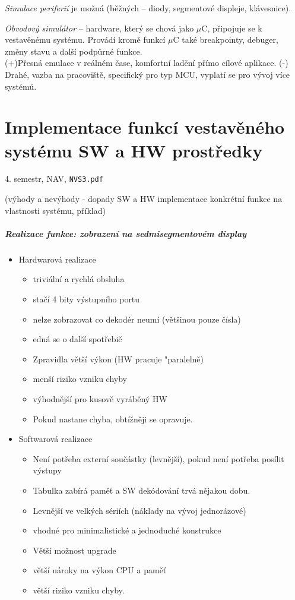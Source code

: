 \documentclass[a4paper, 11pt]{report}
\begin{document}
\emph{Simulace periferií} je možná (běžných -- diody, segmentové displeje, klávesnice).

\emph{Obvodový simulátor} -- hardware, který se chová jako $\mu$C, připojuje se k vestavěnému systému. Provádí kromě funkcí $\mu$C také breakpointy, debuger, změny stavu a další podpůrné funkce.\\
(+)Přesná emulace v reálném čase, komfortní ladění přímo cílové aplikace. (-) Drahé, vazba na pracoviště, specifický pro typ MCU, vyplatí se pro vývoj více systémů.

\chapter{Implementace funkcí vestavěného systému SW a HW prostředky} \label{cha:59}
4. semestr, NAV, \texttt{NVS3.pdf}

(výhody a nevýhody - dopady SW a HW implementace konkrétní funkce na vlastnosti systému, příklad)

\paragraph{Realizace funkce: zobrazení na sedmisegmentovém display}
\begin{itemize}
	\item Hardwarová realizace
	\begin{itemize}
		\item triviální a rychlá obsluha
		\item stačí 4 bity výstupního portu
		\item nelze zobrazovat co dekodér neumí (většinou pouze čísla)
		\item edná se o další spotřebič
		\item Zpravidla větší výkon (HW pracuje "paralelně)
		\item menší riziko vzniku chyby
		\item výhodnější pro kusově vyráběný HW
		\item Pokud nastane chyba, obtížněji se opravuje.
	\end{itemize}
	\item Softwarová realizace
	\begin{itemize}
		\item Není potřeba externí součástky (levnější), pokud není potřeba posílit výstupy
		\item Tabulka zabírá paměť a SW dekódování trvá nějakou dobu.
		\item Levnější ve velkých sériích (náklady na vývoj jednorázové)
		\item vhodné pro minimalistické a jednoduché konstrukce
		\item Větší možnost upgrade
		\item větší nároky na výkon CPU a paměť
		\item větší riziko vzniku chyby.
	\end{itemize}
\end{itemize}
\end{document}

